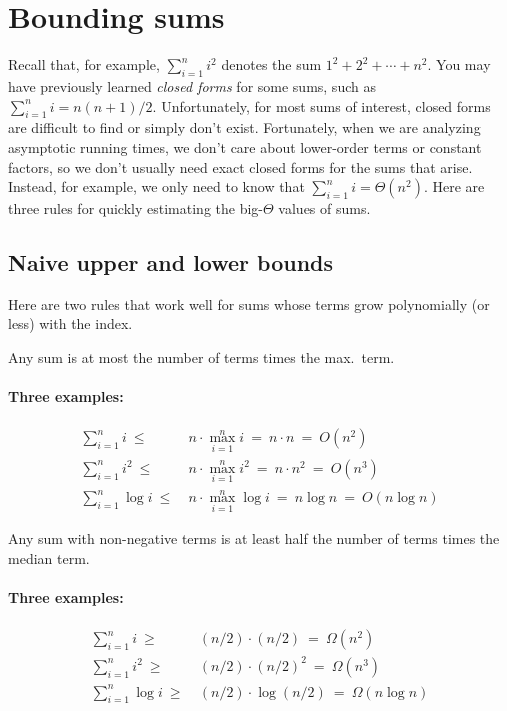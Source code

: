 
\section{Bounding sums}\label{dc: sec: bounding sums}

Recall that, for example, $\sum_{i=1}^n i^2$ denotes the sum $1^2 + 2^2 + \cdots + n^2$.
You may have previously learned \emph{closed forms} for some sums,
such as $\sum_{i=1}^n i = n(n+1)/2$.
Unfortunately, for most sums of interest, closed forms
are difficult to find or simply don't exist.
Fortunately, when we are analyzing asymptotic running times,
we don't care about lower-order terms or constant factors,
so we don't usually need exact closed forms for the sums that arise.
Instead, for example, we only need to know that $\sum_{i=1}^n i = \Theta(n^2)$.
Here are three rules for quickly estimating the big-$\Theta$ values of sums.

\subsection{Naive upper and lower bounds}
Here are two rules that work well for sums whose terms grow polynomially (or less) with the index.

\begin{observation}
  Any sum is at most the number of terms times the max.~term.
\end{observation}
\paragraph{Three examples:}
\begin{align*}
  \textstyle \sum_{i=1}^n i ~\le~ {}
  & n \cdot \max_{i=1}^n i ~=~ n\cdot n ~=~ O(n^2)
  \\
  \textstyle \sum_{i=1}^n i^2 ~\le~ {}
  & n \cdot \max_{i=1}^n i^2 ~=~ n\cdot n^2 ~=~ O(n^3)
  \\
  \textstyle \sum_{i=1}^n \log i ~\le~ {}
  & n \cdot \max_{i=1}^n \log i ~=~ n \log n ~=~ O(n \log n)
\end{align*}

\begin{observation}
  Any sum with non-negative terms
  is at least half the number of terms times the median term.
\end{observation}
\paragraph{Three examples:}
\begin{align*}
  \textstyle \sum_{i=1}^n i ~\ge~ {}
  & (n/2) \cdot (n/2) ~=~ \Omega(n^2)
  \\
  \textstyle \sum_{i=1}^n i^2 ~\ge~ {}
  & (n/2) \cdot (n/2)^2 ~=~ \Omega(n^3)
  \\
  \textstyle \sum_{i=1}^n \log i ~\ge~ {}
  & (n/2) \cdot \log (n/2) ~=~ \Omega(n \log n)
\end{align*}
 
